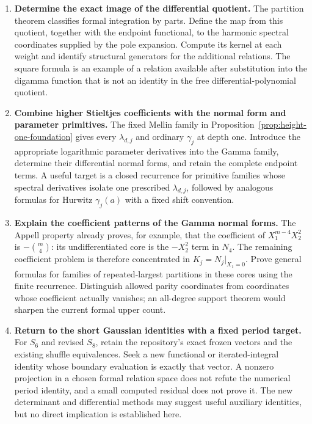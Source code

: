 \documentclass[11pt,a4paper]{article}
\numberwithin{equation}{section}
\theoremstyle{plain}
\theoremstyle{definition}
\theoremstyle{remark}
\begin{document}
\begin{enumerate}[leftmargin=*,label=\textbf{R\arabic*.}]
\item \textbf{Determine the exact image of the differential quotient.}
The partition theorem classifies formal integration by parts. Define the
map from this quotient, together with the endpoint functional, to the
harmonic spectral coordinates supplied by the pole expansion. Compute
its kernel at each weight and identify structural generators for the
additional relations. The square formula is an example of a relation
available after substitution into the digamma function that is not an
identity in the free differential-polynomial quotient.

\item \textbf{Combine higher Stieltjes coefficients with the normal
form and parameter primitives.}
The fixed Mellin family in Proposition~\ref{prop:height-one-foundation}
gives every $\lambda_{d,j}$ and ordinary $\gamma_j$ at depth one.
Introduce the appropriate logarithmic parameter derivatives into the
Gamma family, determine their differential normal forms, and retain the
complete endpoint terms. A useful target is a closed recurrence for
primitive families whose spectral derivatives isolate one prescribed
$\lambda_{d,j}$, followed by analogous formulas for Hurwitz
$\gamma_j(a)$ with a fixed shift convention.

\item \textbf{Explain the coefficient patterns of the Gamma normal
forms.}
The Appell property already proves, for example, that the coefficient of
$X_1^{m-4}X_2^2$ is $-\binom m4$: its undifferentiated core is the
$-X_2^2$ term in $N_4$. The remaining coefficient problem is therefore
concentrated in $K_j=N_j|_{X_1=0}$. Prove general formulas for families
of repeated-largest partitions in these cores using the finite recurrence.
Distinguish allowed parity coordinates from coordinates whose coefficient
actually vanishes; an all-degree support theorem would sharpen the
current formal upper count.

\item \textbf{Return to the short Gaussian identities with a fixed
period target.}
For $S_6$ and revised $S_8$, retain the repository's exact frozen
vectors and the existing shuffle equivalences. Seek a new functional or
iterated-integral identity whose boundary evaluation is exactly that
vector. A nonzero projection in a chosen formal relation space does not
refute the numerical period identity, and a small computed residual does
not prove it. The new determinant and differential methods may suggest
useful auxiliary identities, but no direct implication is established here.
\end{enumerate}
\end{document}
